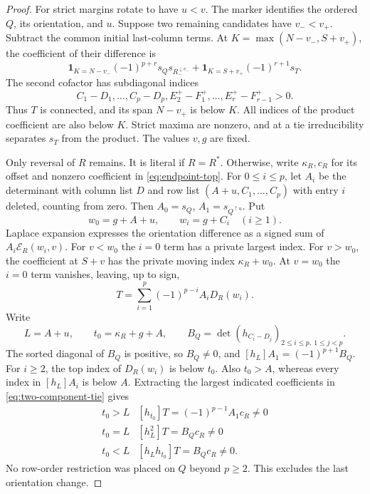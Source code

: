 \documentclass[11pt,a4paper]{amsart}
\numberwithin{equation}{section}
\theoremstyle{plain}
\theoremstyle{definition}
\begin{document}
\begin{proof}
For strict margins rotate to have \(u<v\).  The marker identifies the ordered \(Q\), its orientation, and \(u\).  Suppose two remaining candidates have \(v_-<v_+\).  Subtract the common initial last-column terms.  At \(K=\max(N-v_-,S+v_+)\), the coefficient of their difference is
\begin{equation}\label{eq:two-component-separator}
 \mathbf1_{K=N-v_-}(-1)^{p+r}s_Qs_{R_-^{\downarrow v_-}}
 +\mathbf1_{K=S+v_+}(-1)^{r+1}s_T.
\end{equation}
The second cofactor has subdiagonal indices
\[
 C_1-D_1,\ldots,C_p-D_p,E_2^+-F_1^+,\ldots,E_r^+-F_{r-1}^+>0.
\]
Thus \(T\) is connected, and its span \(N-v_+\) is below \(K\).  All indices of the product coefficient are also below \(K\).  Strict maxima are nonzero, and at a tie irreducibility separates \(s_T\) from the product.  The values \(v,g\) are fixed.

Only reversal of \(R\) remains.  It is literal if \(R=R^*\).  Otherwise, write \(\kappa_R,c_R\) for its offset and nonzero coefficient in \eqref{eq:endpoint-top}.  For \(0\le i\le p\), let \(A_i\) be the determinant with column list \(D\) and row list \((A+u,C_1,\ldots,C_p)\) with entry \(i\) deleted, counting from zero.  Then \(A_0=s_Q\), \(A_1=s_{Q^{\uparrow u}}\).  Put
\[
 w_0=g+A+u,\qquad w_i=g+C_i\quad(i\ge1).
\]
Laplace expansion expresses the orientation difference as a signed sum of \(A_i\mathcal E_R(w_i,v)\).  For \(v<w_0\) the \(i=0\) term has a private largest index.  For \(v>w_0\), the coefficient at \(S+v\) has the private moving index \(\kappa_R+w_0\).  At \(v=w_0\) the \(i=0\) term vanishes, leaving, up to sign,
\begin{equation}\label{eq:two-component-tie}
 T=\sum_{i=1}^p(-1)^{p-i}A_i D_R(w_i).
\end{equation}
Write
\[
 L=A+u,\qquad t_0=\kappa_R+g+A,\qquad
 B_Q=\det(h_{C_i-D_j})_{2\le i\le p,\ 1\le j<p}.
\]
The sorted diagonal of \(B_Q\) is positive, so \(B_Q\ne0\), and
\([h_L]A_1=(-1)^{p+1}B_Q\).
For \(i\ge2\), the top index of \( D_R(w_i)\) is below \(t_0\).  Also \(t_0>A\), whereas every index in \([h_L]A_i\) is below \(A\).  Extracting the largest indicated coefficients in \eqref{eq:two-component-tie} gives
\begin{equation}\label{eq:two-component-tie-table}
 \begin{array}{c|c}
 t_0>L &[h_{t_0}]T=(-1)^{p-1}A_1c_R\ne0\\
 t_0=L &[h_L^2]T=B_Qc_R\ne0\\
 t_0<L &[h_Lh_{t_0}]T=B_Qc_R\ne0.
 \end{array}
\end{equation}
No row-order restriction was placed on \(Q\) beyond \(p\ge2\).  This excludes the last orientation change.
\end{proof}
\end{document}
